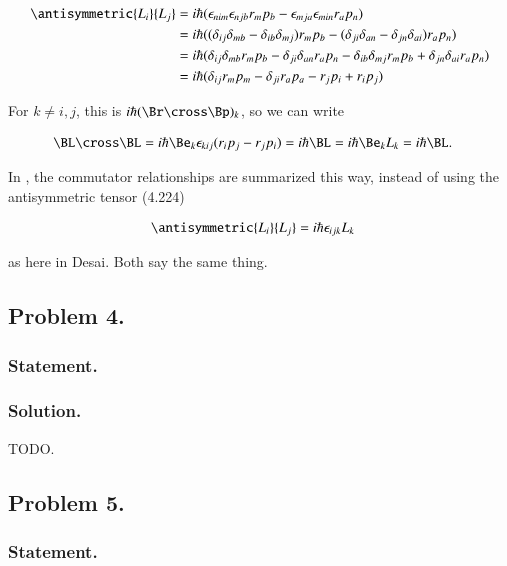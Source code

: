 \begin{align*}
\antisymmetric{L_i}{L_j}
&=
i \hbar ( \epsilon_{nim} \epsilon_{njb} r_m p_b - \epsilon_{mja} \epsilon_{min} r_a p_n ) \\
&=
i \hbar ( (\delta_{ij} \delta_{mb} -\delta_{ib} \delta_{mj}) r_m p_b - (\delta_{ji} \delta_{an} -\delta_{jn} \delta_{ai}) r_a p_n ) \\
&=
i \hbar (\delta_{ij} \delta_{mb} r_m p_b - \delta_{ji} \delta_{an} r_a p_n - \delta_{ib} \delta_{mj} r_m p_b + \delta_{jn} \delta_{ai} r_a p_n ) \\
&=
i \hbar (
\delta_{ij} r_m p_m
- \delta_{ji} r_a p_a
- r_j p_i
+ r_i p_j ) \\
\end{align*}

For $k \ne i,j$, this is $i\hbar (\Br \cross \Bp)_k$, so we can write

\begin{align}\label{eqn:desaiCh4:301}
\BL \cross \BL &= i\hbar \Be_k \epsilon_{kij} ( r_i p_j - r_j p_i ) = i\hbar \BL = i\hbar \Be_k L_k = i\hbar \BL.
\end{align}

In \citep{liboff2003iqm}, the commutator relationships are summarized this way, instead of using the antisymmetric tensor (4.224)

\begin{align}\label{eqn:desaiCh4:302}
\antisymmetric{L_i}{L_j} &= i \hbar \epsilon_{ijk} L_k
\end{align}

as here in Desai.  Both say the same thing.

\subsection{Problem 4.}
\subsubsection{Statement.}
\subsubsection{Solution.}

TODO.
\subsection{Problem 5.}
\subsubsection{Statement.}

